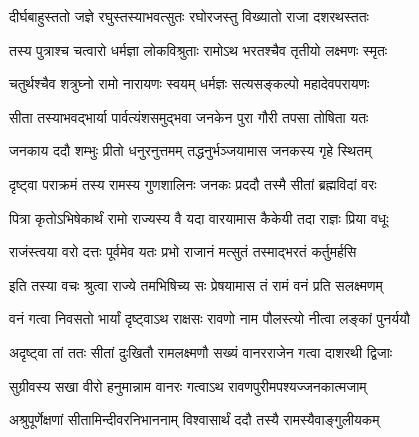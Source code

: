 
\vakta{}
\shrota{}
\translink{}

\storymeta



\addtocounter{shlokacount}{47}

\twolineshloka
{दीर्घबाहुस्ततो जज्ञे रघुस्तस्याभवत्सुतः}
{रघोरजस्तु विख्यातो राजा दशरथस्ततः} %

\twolineshloka
{तस्य पुत्राश्च चत्वारो धर्मज्ञा लोकविश्रुताः}
{रामोऽथ भरतश्चैव तृतीयो लक्ष्मणः स्मृतः} %

\twolineshloka
{चतुर्थश्चैव शत्रुघ्नो रामो नारायणः स्वयम्}
{धर्मज्ञः सत्यसङ्कल्पो महादेवपरायणः} %

\twolineshloka
{सीता तस्याभवद्भार्या पार्वत्यंशसमुद्भवा}
{जनकेन पुरा गौरी तपसा तोषिता यतः} %

\twolineshloka
{जनकाय ददौ शम्भुः प्रीतो धनुरनुत्तमम्}
{तद्धनुर्भञ्जयामास जनकस्य गृहे स्थितम्} %

\twolineshloka
{दृष्ट्वा पराक्रमं तस्य रामस्य गुणशालिनः}
{जनकः प्रददौ तस्मै सीतां ब्रह्मविदां वरः} %

\twolineshloka
{पित्रा कृतोऽभिषेकार्थं रामो राज्यस्य वै यदा}
{वारयामास कैकेयी तदा राज्ञः प्रिया वधूः} %

\twolineshloka
{राजंस्त्वया वरो दत्तः पूर्वमेव यतः प्रभो}
{राजानं मत्सुतं तस्माद्भरतं कर्तुमर्हसि} %

\twolineshloka
{इति तस्या वचः श्रुत्वा राज्ये तमभिषिच्य सः}
{प्रेषयामास तं रामं वनं प्रति सलक्ष्मणम्} %

\twolineshloka
{वनं गत्वा निवसतो भार्यां दृष्ट्वाऽथ राक्षसः}
{रावणो नाम पौलस्त्यो नीत्वा लङ्कां पुनर्ययौ} %

\twolineshloka
{अदृष्ट्वा तां ततः सीतां दुःखितौ रामलक्ष्मणौ}
{सख्यं वानरराजेन गत्वा दाशरथी द्विजाः} %

\twolineshloka
{सुग्रीवस्य सखा वीरो हनुमान्नाम वानरः}
{गत्वाऽथ रावणपुरीमपश्यज्जनकात्मजाम्} %

\twolineshloka
{अश्रुपूर्णेक्षणां सीतामिन्दीवरनिभाननाम्}
{विश्वासार्थं ददौ तस्यै रामस्यैवाङ्गुलीयकम्} %

